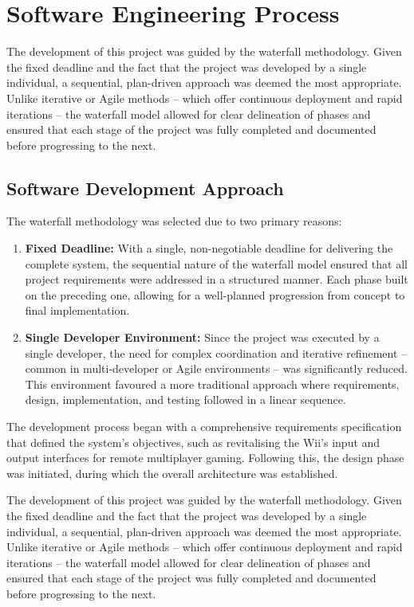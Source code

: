 \chapter{Software Engineering Process}
\label{chapter:sep}


The development of this project was guided by the waterfall methodology\cite{royce1987managing}. Given the fixed deadline and the fact that the project was developed by a single individual, a sequential, plan-driven approach was deemed the most appropriate. Unlike iterative or Agile\cite{atlassian2025agile} methods -- which offer continuous deployment and rapid iterations -- the waterfall model allowed for clear delineation of phases and ensured that each stage of the project was fully completed and documented before progressing to the next.

\section{Software Development Approach}

The waterfall methodology was selected due to two primary reasons:
\begin{enumerate}
	\item \textbf{Fixed Deadline:} With a single, non-negotiable deadline for delivering the complete system, the sequential nature of the waterfall model ensured that all project requirements were addressed in a structured manner. Each phase built on the preceding one, allowing for a well-planned progression from concept to final implementation.
	\item \textbf{Single Developer Environment:} Since the project was executed by a single developer, the need for complex coordination and iterative refinement -- common in multi-developer or Agile environments -- was significantly reduced. This environment favoured a more traditional approach where requirements, design, implementation, and testing followed in a linear sequence.
\end{enumerate}

The development process began with a comprehensive requirements specification that defined the system’s objectives, such as revitalising the Wii’s input and output interfaces for remote multiplayer gaming. Following this, the design phase was initiated, during which the overall architecture was established.

The development of this project was guided by the waterfall methodology. Given the fixed deadline and the fact that the project was developed by a single individual, a sequential, plan-driven approach was deemed the most appropriate. Unlike iterative or Agile methods -- which offer continuous deployment and rapid iterations -- the waterfall model allowed for clear delineation of phases and ensured that each stage of the project was fully completed and documented before progressing to the next.

